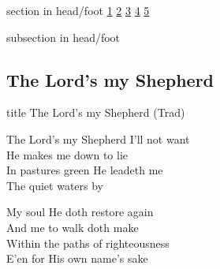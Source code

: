 \documentclass{beamer}
\begin{document}
{
{ 
 {
 \begin{beamercolorbox}[ht=4.5ex,dp=1.5ex,%
      leftskip=.3cm,rightskip=.3cm plus1fil]{section in head/foot}
 \fontsize{12}{25}\selectfont 
\hyperlink{The Lord's my Shepherd['Psalm 23'](Trad)1}{1}
\hyperlink{The Lord's my Shepherd['Psalm 23'](Trad)2}{2}
\hyperlink{The Lord's my Shepherd['Psalm 23'](Trad)3}{3}
\hyperlink{The Lord's my Shepherd['Psalm 23'](Trad)4}{4}
\hyperlink{The Lord's my Shepherd['Psalm 23'](Trad)5}{5}
 
 \end{beamercolorbox}%
  \begin{beamercolorbox}[ht=2.5ex,dp=1.125ex,%
   leftskip=.3cm,rightskip=.3cm plus1fil]{subsection in head/foot}
   \insertauthor
 \end{beamercolorbox}%
 }
}
\subsection{ The Lord's my Shepherd }

\hypertarget{The Lord's my Shepherd['Psalm 23'](Trad)}{}
\begin{frame}{}
 \vfill
  \centering
  \begin{beamercolorbox}[sep=8pt,center,shadow=true,rounded=true]{title}
    The Lord's my Shepherd (Trad)    
  \end{beamercolorbox}
  \vfill
\end{frame}

\hypertarget{The Lord's my Shepherd['Psalm 23'](Trad)1}{}
\begin{frame}{}
\fontsize{ 18 }{ 23 }\selectfont

The Lord's my Shepherd I'll not want\\ 
He makes me down to lie\\ 
In pastures green He leadeth me\\ 
The quiet waters by 

\end{frame}

\hypertarget{The Lord's my Shepherd['Psalm 23'](Trad)2}{}
\begin{frame}{}
\fontsize{ 18 }{ 23 }\selectfont

My soul He doth restore again\\ 
And me to walk doth make\\ 
Within the paths of righteousness\\ 
E'en for His own name's sake 


\end{frame}}
\end{document}
